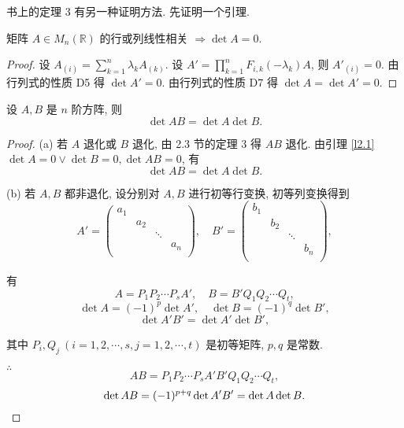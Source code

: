 \documentclass[color=black,device=normal,lang=cn,mode=geye]{elegantnote}
\begin{document}
书上的定理 3 有另一种证明方法. 先证明一个引理.
\begin{lemma}\label{l2.1}
    矩阵 $A\in M_n(\mathbb{R})$ 的行或列线性相关 $\Rightarrow\det A=0$.
\end{lemma}
\begin{proof}
    设 $A_{(i)}=\sum\limits_{k=1}^n\lambda_kA_{(k)}$. 设 $A'=\prod\limits_{k=1}^nF_{i,k}(-\lambda_{k})A$, 则 $A'_{(i)}=0$. 由行列式的性质 D5 得 $\det A'=0$. 由行列式的性质 D7 得 $\det A=\det A'=0.$
\end{proof}
\begin{theorem}[书上的定理 3]
    设 $A,B$ 是 $n$ 阶方阵, 则
    \[\det AB=\det A\det B.\]
\end{theorem}
\begin{proof}
    (a) 若 $A$ 退化或 $B$ 退化, 由 2.3 节的定理 3 得 $AB$ 退化. 由引理 \ref{l2.1} $\det A=0\vee\det B=0,\det AB=0$, 有
    \[\det AB=\det A\det B.\]

    (b) 若 $A,B$ 都非退化, 设分别对 $A,B$ 进行初等行变换, 初等列变换得到
    \[A'=\begin{pmatrix}
        a_{1} \\
        & a_{2} \\
        && \ddots \\
        &&& a_{n} \\
    \end{pmatrix},\quad B'=\begin{pmatrix}
        b_{1} \\
        & b_{2} \\
        && \ddots \\
        &&& b_{n} \\
    \end{pmatrix},\]

    有
    \[A=P_1P_2\cdots P_sA',\quad B=B'Q_1Q_2\cdots Q_t,\]
    \[\det A=(-1)^p\det A',\quad\det B=(-1)^q\det B',\]
    \[\det A'B'=\det A'\det B',\]

    其中 $P_i,Q_j\ (i=1,2,\cdots,s,j=1,2,\cdots,t)$ 是初等矩阵, $p,q$ 是常数.

    $\therefore$
    \[AB=P_1P_2\cdots P_sA'B'Q_1Q_2\cdots Q_t,\]
    \[\det AB=(-1)^{p+q}\det A'B'=\det A\det B.\qedhere\]
\end{proof}
\end{document}
